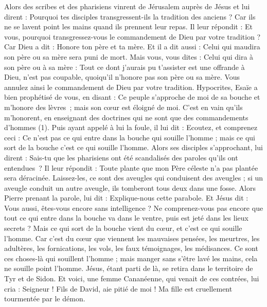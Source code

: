 \begin{multicols}{2}
{\VerseOne{}Alors des scribes et des pharisiens vinrent de Jérusalem auprès de Jésus et lui dirent :
Pourquoi tes disciples transgressent-ils la tradition des anciens ? Car ils ne se lavent point les mains quand ils prennent leur repas.
Il leur répondit : Et vous, pourquoi transgressez-vous le commandement de Dieu par votre tradition ?
Car Dieu a dit : Honore ton père et ta mère. Et il a dit aussi : Celui qui maudira son père ou sa mère sera puni de mort.
Mais vous, vous dites : Celui qui dira à son père ou à sa mère : Tout ce dont j’aurais pu t’assister est une offrande à Dieu, n’est pas coupable, quoiqu’il n’honore pas son père ou sa mère.
Vous annulez ainsi le commandement de Dieu par votre tradition.
Hypocrites, Esaïe a bien prophétisé de vous, en disant :
Ce peuple s’approche de moi de sa bouche et m’honore des lèvres ; mais son cœur est éloigné de moi.
C’est en vain qu’ils m'honorent, en enseignant des doctrines qui ne sont que des commandements d'hommes (1).
Puis ayant appelé à lui la foule, il lui dit : Ecoutez, et comprenez ceci :
Ce n'est pas ce qui entre dans la bouche qui souille l'homme ; mais ce qui sort de la bouche c'est ce qui souille l'homme.
Alors ses disciples s'approchant, lui dirent : Sais-tu que les pharisiens ont été scandalisés des paroles qu’ils ont entendues ?
Il leur répondit : Toute plante que mon Père céleste n'a pas plantée sera déracinée.
Laissez-les, ce sont des aveugles qui conduisent des aveugles ; si un aveugle conduit un autre aveugle, ils tomberont tous deux dans une fosse.
Alors Pierre prenant la parole, lui dit : Explique-nous cette parabole.
Et Jésus dit : Vous aussi, êtes-vous encore sans intelligence ?
Ne comprenez-vous pas encore que tout ce qui entre dans la bouche va dans le ventre, puis est jeté dans les lieux secrets ?
Mais ce qui sort de la bouche vient du cœur, et c’est ce qui souille l'homme.
Car c’est du cœur que viennent les mauvaises pensées, les meurtres, les adultères, les fornications, les vols, les faux témoignages, les médisances.
Ce sont ces choses-là qui souillent l'homme ; mais manger sans s’être lavé les mains, cela ne souille point l'homme.
Jésus, étant parti de là, se retira dans le territoire de Tyr et de Sidon.
Et voici, une femme Cananéenne, qui venait de ces contrées, lui cria : Seigneur ! Fils de David, aie pitié de moi ! Ma fille est cruellement tourmentée par le démon.
}
\end{multicols}
